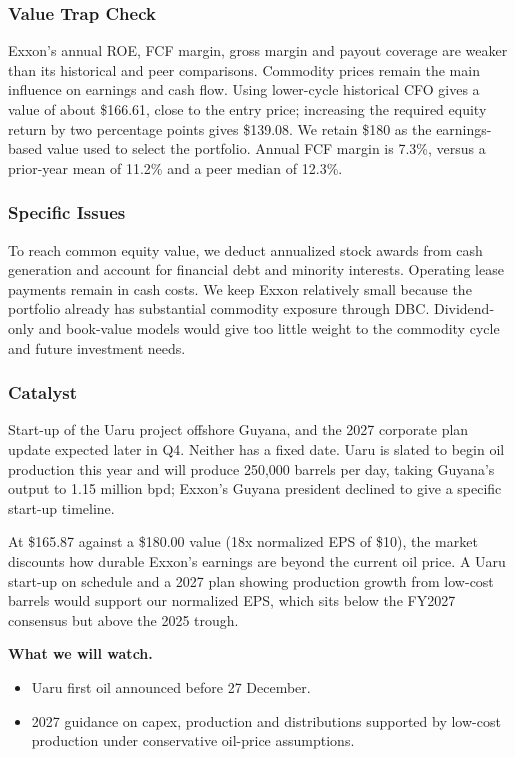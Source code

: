 \documentclass[10pt,a4paper]{article}
\begin{document}
\subsubsection*{Value Trap Check}
Exxon's annual ROE, FCF margin, gross margin and payout coverage are weaker than its historical and peer comparisons. Commodity prices remain the main influence on earnings and cash flow. Using lower-cycle historical CFO gives a value of about \$166.61, close to the entry price; increasing the required equity return by two percentage points gives \$139.08. We retain \$180 as the earnings-based value used to select the portfolio. Annual FCF margin is 7.3\%, versus a prior-year mean of 11.2\% and a peer median of 12.3\%.

\subsubsection*{Specific Issues}
To reach common equity value, we deduct annualized stock awards from cash generation and account for financial debt and minority interests. Operating lease payments remain in cash costs. We keep Exxon relatively small because the portfolio already has substantial commodity exposure through DBC. Dividend-only and book-value models would give too little weight to the commodity cycle and future investment needs.

\subsubsection*{Catalyst}
Start-up of the Uaru project offshore Guyana, and the 2027 corporate plan update expected later in Q4. Neither has a fixed date. Uaru is slated to begin oil production this year and will produce 250,000 barrels per day, taking Guyana's output to 1.15 million bpd; Exxon's Guyana president declined to give a specific start-up timeline.

At \$165.87 against a \$180.00 value (18x normalized EPS of \$10), the market discounts how durable Exxon's earnings are beyond the current oil price. A Uaru start-up on schedule and a 2027 plan showing production growth from low-cost barrels would support our normalized EPS, which sits below the FY2027 consensus but above the 2025 trough.

\textbf{What we will watch.}
\begin{itemize}[leftmargin=1.2em,itemsep=2pt,topsep=2pt]
  \item Uaru first oil announced before 27 December.
  \item 2027 guidance on capex, production and distributions supported by low-cost production under conservative oil-price assumptions.
\end{itemize}
\end{document}

